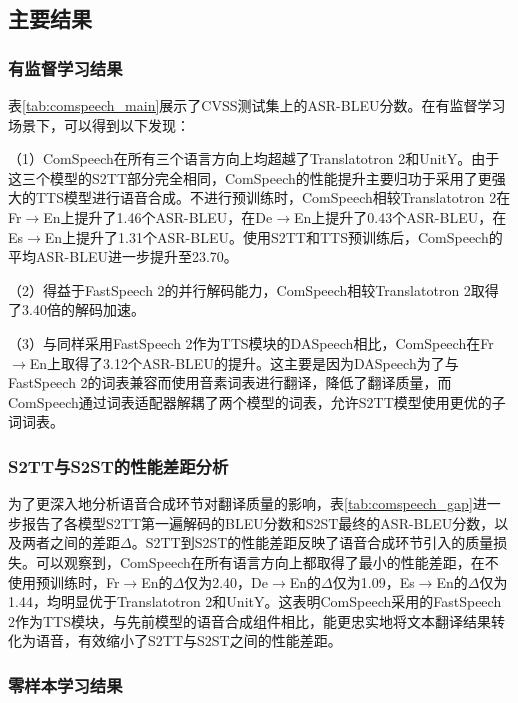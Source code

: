 \subsection{主要结果}

\subsubsection{有监督学习结果}



表\ref{tab:comspeech_main}展示了CVSS测试集上的ASR-BLEU分数。在有监督学习场景下，可以得到以下发现：

（1）ComSpeech在所有三个语言方向上均超越了Translatotron 2和UnitY。由于这三个模型的S2TT部分完全相同，ComSpeech的性能提升主要归功于采用了更强大的TTS模型进行语音合成。不进行预训练时，ComSpeech相较Translatotron 2在Fr$\rightarrow$En上提升了1.46个ASR-BLEU，在De$\rightarrow$En上提升了0.43个ASR-BLEU，在Es$\rightarrow$En上提升了1.31个ASR-BLEU。使用S2TT和TTS预训练后，ComSpeech的平均ASR-BLEU进一步提升至23.70。

（2）得益于FastSpeech 2的并行解码能力，ComSpeech相较Translatotron 2取得了3.40倍的解码加速。

（3）与同样采用FastSpeech 2作为TTS模块的DASpeech相比，ComSpeech在Fr$\rightarrow$En上取得了3.12个ASR-BLEU的提升。这主要是因为DASpeech为了与FastSpeech 2的词表兼容而使用音素词表进行翻译，降低了翻译质量，而ComSpeech通过词表适配器解耦了两个模型的词表，允许S2TT模型使用更优的子词词表。

\subsubsection{S2TT与S2ST的性能差距分析}



为了更深入地分析语音合成环节对翻译质量的影响，表\ref{tab:comspeech_gap}进一步报告了各模型S2TT第一遍解码的BLEU分数和S2ST最终的ASR-BLEU分数，以及两者之间的差距$\Delta$。S2TT到S2ST的性能差距反映了语音合成环节引入的质量损失。可以观察到，ComSpeech在所有语言方向上都取得了最小的性能差距，在不使用预训练时，Fr$\rightarrow$En的$\Delta$仅为2.40，De$\rightarrow$En的$\Delta$仅为1.09，Es$\rightarrow$En的$\Delta$仅为1.44，均明显优于Translatotron 2和UnitY。这表明ComSpeech采用的FastSpeech 2作为TTS模块，与先前模型的语音合成组件相比，能更忠实地将文本翻译结果转化为语音，有效缩小了S2TT与S2ST之间的性能差距。

\subsubsection{零样本学习结果}

